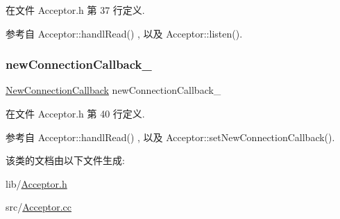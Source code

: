 在文件 Acceptor.\+h 第 37 行定义.



参考自 Acceptor\+::handl\+Read() , 以及 Acceptor\+::listen().

\mbox{\label{classmuduo_1_1Acceptor_a315d8356d0420fe5a89dc67f49c82617}} 
\subsubsection{\texorpdfstring{new\+Connection\+Callback\+\_\+}{newConnectionCallback\_}}
{\footnotesize\ttfamily \hyperlink{classmuduo_1_1Acceptor_ad9da8988c47fddac6b0b91e01e154814}{New\+Connection\+Callback} new\+Connection\+Callback\+\_\+\hspace{0.3cm}{\ttfamily [private]}}



在文件 Acceptor.\+h 第 40 行定义.



参考自 Acceptor\+::handl\+Read() , 以及 Acceptor\+::set\+New\+Connection\+Callback().



该类的文档由以下文件生成\+:\begin{DoxyCompactItemize}
\item 
lib/\hyperlink{Acceptor_8h}{Acceptor.\+h}\item 
src/\hyperlink{Acceptor_8cc}{Acceptor.\+cc}\end{DoxyCompactItemize}
